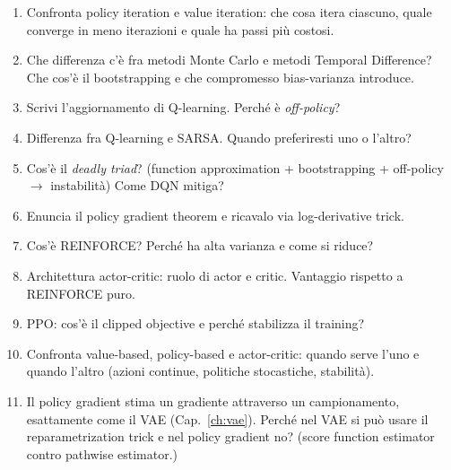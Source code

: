 \begin{tcolorbox}[mywarn, title={Domande d'esame — RL}]
\begin{enumerate}
  \item Confronta policy iteration e value iteration: che cosa itera ciascuno, quale converge in meno iterazioni e quale ha passi più costosi.
  \item Che differenza c'è fra metodi Monte Carlo e metodi Temporal Difference? Che cos'è il bootstrapping e che compromesso bias-varianza introduce.
  \item Scrivi l'aggiornamento di Q-learning. Perché è \emph{off-policy}?
  \item Differenza fra Q-learning e SARSA. Quando preferiresti uno o l'altro?
  \item Cos'è il \emph{deadly triad}? (function approximation + bootstrapping + off-policy $\to$ instabilità) Come DQN mitiga?
  \item Enuncia il policy gradient theorem e ricavalo via log-derivative trick.
  \item Cos'è REINFORCE? Perché ha alta varianza e come si riduce?
  \item Architettura actor-critic: ruolo di actor e critic. Vantaggio rispetto a REINFORCE puro.
  \item PPO: cos'è il clipped objective e perché stabilizza il training?
  \item Confronta value-based, policy-based e actor-critic: quando serve l'uno e quando l'altro (azioni continue, politiche stocastiche, stabilità).
  \item Il policy gradient stima un gradiente attraverso un campionamento, esattamente come il VAE (Cap.~\ref{ch:vae}). Perché nel VAE si può usare il reparametrization trick e nel policy gradient no? (score function estimator contro pathwise estimator.)
\end{enumerate}
\end{tcolorbox}
